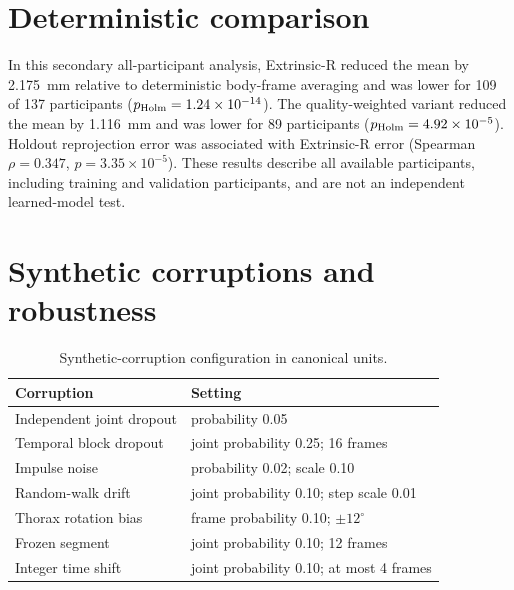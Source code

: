 \documentclass[pdflatex,sn-mathphys-num]{sn-jnl}
\begin{document}
\clearpage
\section{Deterministic comparison}





In this secondary all-participant analysis, Extrinsic-R reduced the mean by
2.175~mm relative to deterministic body-frame averaging and was lower for 109
of 137 participants ($p_{\rm Holm}=1.24\times10^{-14}$). The quality-weighted
variant reduced the mean by 1.116~mm and was lower for 89 participants
($p_{\rm Holm}=4.92\times10^{-5}$). Holdout reprojection error was associated
with Extrinsic-R error (Spearman $\rho=0.347$, $p=3.35\times10^{-5}$). These
results describe all available participants, including training and validation
participants, and are not an independent learned-model test.
\clearpage

\section{Synthetic corruptions and robustness}

\begin{table}[h]
\caption{Synthetic-corruption configuration in canonical units.}
\label{tab:corruptions}
\centering
\small
\begin{tabular}{ll}
\toprule
Corruption & Setting\\
\midrule
Independent joint dropout & probability 0.05\\
Temporal block dropout & joint probability 0.25; 16 frames\\
Impulse noise & probability 0.02; scale 0.10\\
Random-walk drift & joint probability 0.10; step scale 0.01\\
Thorax rotation bias & frame probability 0.10; $\pm12^\circ$\\
Frozen segment & joint probability 0.10; 12 frames\\
Integer time shift & joint probability 0.10; at most 4 frames\\
\bottomrule
\end{tabular}
\end{table}
\end{document}
